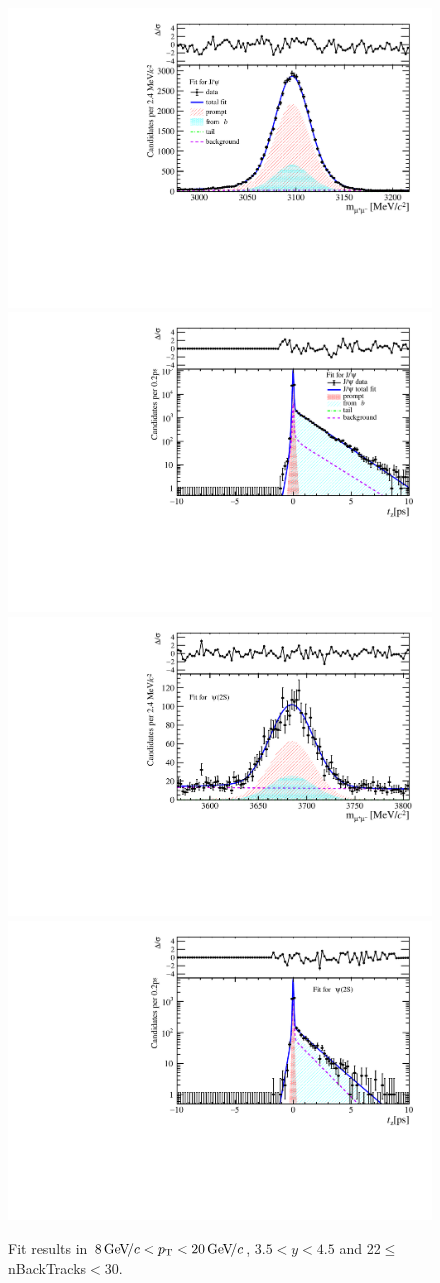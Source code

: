 \begin{figure}[H]
\begin{center}
\includegraphics[width=0.47\linewidth]{pdf/Jpsi/drawmassB/n4y3pt5.pdf}
\includegraphics[width=0.47\linewidth]{pdf/Jpsi/2DFitB/n4y3pt5.pdf}
\vspace*{-0.5cm}
\includegraphics[width=0.47\linewidth]{pdf/Psi2S/drawmassB/n4y3pt5.pdf}
\includegraphics[width=0.47\linewidth]{pdf/Psi2S/2DFitB/n4y3pt5.pdf}
\vspace*{-0.5cm}
\end{center}
\caption{Fit results in $8\text{\,Ge\kern -0.1em V\!/}c<p_{\mathrm{T}}<20\text{\,Ge\kern -0.1em V\!/}c$, $3.5<y<4.5$ and 22$\leq$nBackTracks$<$30.}
\label{Fitn4y3pt5}
\end{figure}
